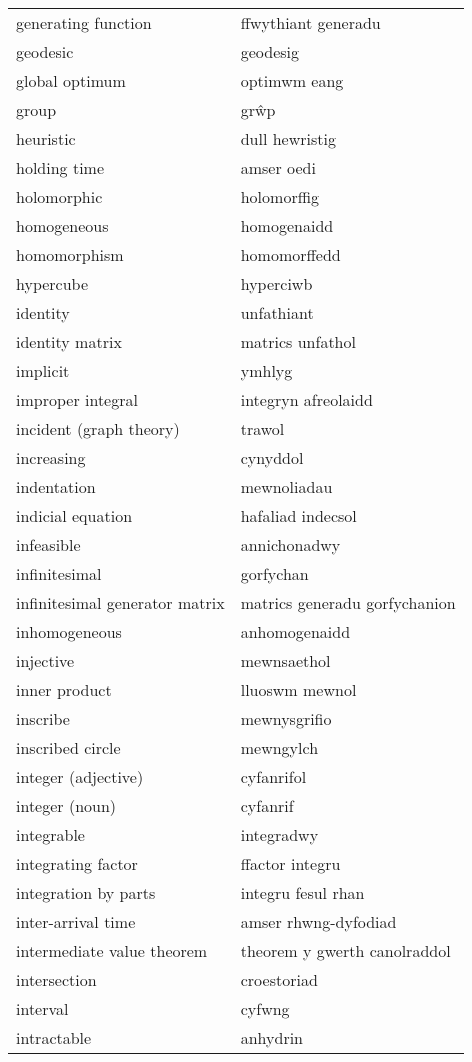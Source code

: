 \begin{supertabular}{p{0.22\textwidth}p{0.22\textwidth}}
generating function & ffwythiant generadu \\
geodesic & geodesig \\
global optimum & optimwm eang \\
group & grŵp \\
heuristic & dull hewristig \\
holding time & amser oedi \\
holomorphic & holomorffig \\
homogeneous & homogenaidd \\
homomorphism & homomorffedd \\
hypercube & hyperciwb \\
identity & unfathiant \\
identity matrix & matrics unfathol \\
implicit & ymhlyg \\
improper integral & integryn afreolaidd \\
incident (graph theory) & trawol \\
increasing & cynyddol \\
indentation & mewnoliadau \\
indicial equation & hafaliad indecsol \\
infeasible & annichonadwy \\
infinitesimal & gorfychan \\
infinitesimal generator matrix & matrics generadu gorfychanion \\
inhomogeneous & anhomogenaidd \\
injective & mewnsaethol \\
inner product & lluoswm mewnol \\
inscribe & mewnysgrifio \\
inscribed circle & mewngylch \\
integer (adjective) & cyfanrifol \\
integer (noun) & cyfanrif \\
integrable & integradwy \\
integrating factor & ffactor integru \\
integration by parts & integru fesul rhan \\
inter-arrival time & amser rhwng-dyfodiad \\
intermediate value theorem & theorem y gwerth canolraddol \\
intersection & croestoriad \\
interval & cyfwng \\
intractable & anhydrin \\

\end{supertabular}
